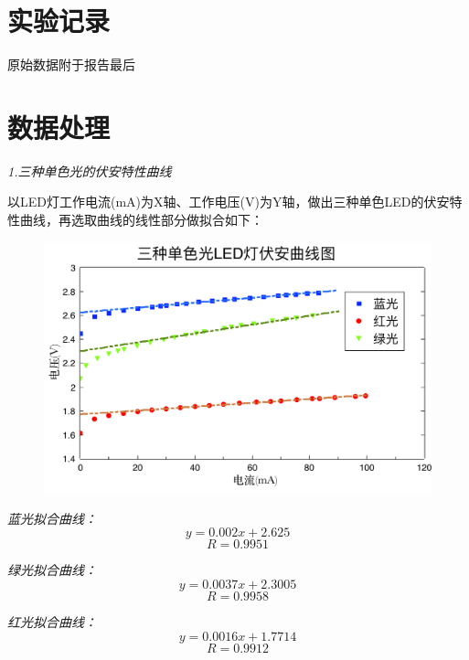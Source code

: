 \documentclass[UTF8]{ctexart}
\begin{document}
    \section{实验记录}
    原始数据附于报告最后

    \section{数据处理}
    \begin{center}
    \emph{1.三种单色光的伏安特性曲线}
    \end{center}

    以LED灯工作电流(mA)为X轴、工作电压(V)为Y轴，做出三种单色LED的伏安特性曲线，再选取曲线的线性部分做拟合如下：
    \begin{figure}[ht]
        \centering 
        \includegraphics[width=12cm]{三种灯.pdf}
    \end{figure}

    \emph{蓝光拟合曲线：}
    \begin{equation*}
        y=0.002x+2.625
    \end{equation*}
    \begin{equation*}
        R=0.9951
    \end{equation*}

    \emph{绿光拟合曲线：}
    \begin{equation*}
        y=0.0037x+2.3005
    \end{equation*}
    \begin{equation*}
        R=0.9958
    \end{equation*}

    \emph{红光拟合曲线：}
    \begin{equation*}
        y=0.0016x+1.7714
    \end{equation*}
    \begin{equation*}
        R=0.9912
    \end{equation*}
\end{document}
